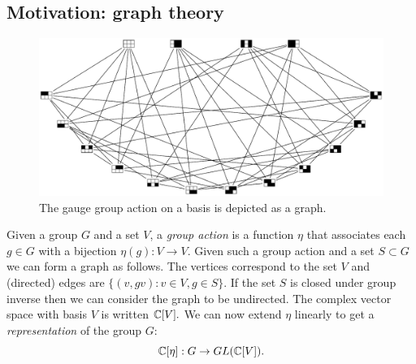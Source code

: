 \documentclass[12pt,notitlepage,longbibliography,nofootinbib,tightenlines]{revtex4}
\begin{document}
%
%

\subsection{Motivation: graph theory}

\begin{figure}[th!]
\begin{center}
        \includegraphics[width=0.9\columnwidth]{fig_compass.pdf}
\caption{
The gauge group action on a basis is depicted as a graph.
}
\label{fig_compass}
\end{center}
\end{figure}

\def\rhoreg{\rho_\mathrm{reg}}

Given a group $G$ and a set $V$,
a {\it group action} 
is a function $\eta$ that associates
each $g\in G$ with a bijection $\eta(g):V\to V.$
Given such a group action and a
set $S\subset G$ we can form a graph as
follows.
The vertices correspond to the set $V$ and
(directed) edges are  $\{(v, gv) : v \in V, g \in S\}.$
If the set $S$ is closed under group inverse then
we can consider the graph to be undirected.
The complex vector space with basis $V$ is written $\mathbb{C}[V].$
We can now extend $\eta$ linearly to get a {\it representation} of
the group $G$:
$$
    \mathbb{C}[\eta] : G \to GL(\mathbb{C}[V]).
$$
\end{document}

